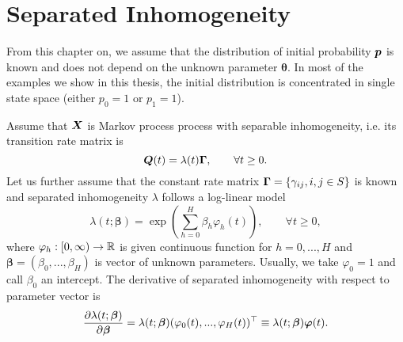{%
\section{Separated Inhomogeneity}
	\label{chap:statSeparInhom}
	
	From this chapter on, we assume that the distribution of initial probability $\bm{p}$ is known and does not depend on the unknown parameter $\bm{\theta}$. In most of the examples we show in this thesis, the initial distribution is concentrated in single state space (either $p_0 = 1$ or $p_1 = 1$).

Assume that $\bm{X}$ is Markov process process with separable inhomogeneity, i.e. its transition rate matrix is
\[
	\bm{Q}(t) = \lambda(t) \bm{\Gamma}, \qquad \forall t \geq 0.
\]
Let us further assume that the constant rate matrix $\bm{\Gamma} = \{\gamma_{ij}, i,j \in S \}$ is known and separated inhomogeneity $\lambda$ follows a log-linear model
\begin{equation}
	\label{eq:logLinearIntensity}
	\lambda (t; \bm{\beta}) = \exp \left( \sum_{h=0}^{H} \beta_h \varphi_h (t) \right), \qquad \forall t \geq 0,
\end{equation}
where $\varphi_h: [0, \infty) \to \mathbb{R}$ is given continuous function for $h = 0, ..., H$ and $\bm{\beta} = (\beta_0, ..., \beta_H)$ is vector of unknown parameters. Usually, we take $\varphi_0 = 1$ and call $\beta_0$ an intercept. The derivative of separated inhomogeneity with respect to parameter vector is
\[
	\frac{\partial \lambda (t; \bm{\beta})}{\partial \bm{\beta}} = \lambda (t; \bm{\beta}) (\varphi_0 (t), ..., \varphi_H (t))^\top \equiv \lambda (t; \bm{\beta}) \bm{\varphi} (t).
\]

}
